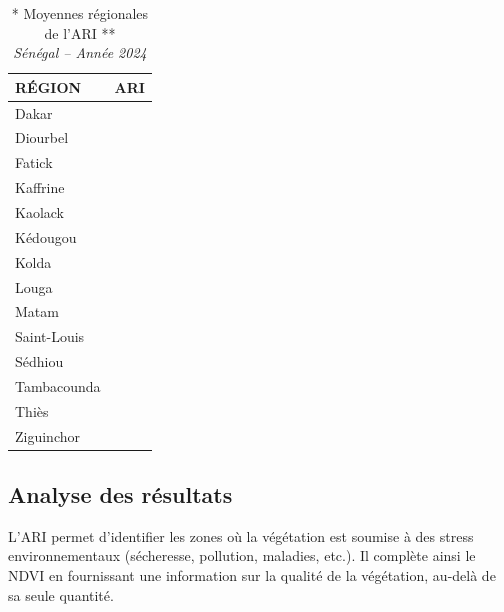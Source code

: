 \documentclass[
]{book}
\begin{document}
\begin{table}[!t]
\caption*{
{\large ** Moyennes régionales de l'ARI **} \\ 
{\small \emph{Sénégal -- Année 2024}}
} 
\fontsize{12.0pt}{14.4pt}\selectfont
\begin{tabular*}{\linewidth}{@{\extracolsep{\fill}}lr}
\toprule
{RÉGION} & {ARI} \\ 
\midrule\addlinespace[2.5pt]
Dakar & {\cellcolor[HTML]{C6171C}{\textcolor[HTML]{FFFFFF}{-0.130}}} \\ 
Diourbel & {\cellcolor[HTML]{FFECE3}{\textcolor[HTML]{000000}{-0.199}}} \\ 
Fatick & {\cellcolor[HTML]{F96244}{\textcolor[HTML]{FFFFFF}{-0.153}}} \\ 
Kaffrine & {\cellcolor[HTML]{FDC3AB}{\textcolor[HTML]{000000}{-0.183}}} \\ 
Kaolack & {\cellcolor[HTML]{FCB499}{\textcolor[HTML]{000000}{-0.178}}} \\ 
Kédougou & {\cellcolor[HTML]{67000D}{\textcolor[HTML]{FFFFFF}{-0.107}}} \\ 
Kolda & {\cellcolor[HTML]{F55239}{\textcolor[HTML]{FFFFFF}{-0.149}}} \\ 
Louga & {\cellcolor[HTML]{FFF5F0}{\textcolor[HTML]{000000}{-0.205}}} \\ 
Matam & {\cellcolor[HTML]{FCB59A}{\textcolor[HTML]{000000}{-0.179}}} \\ 
Saint-Louis & {\cellcolor[HTML]{FCBEA5}{\textcolor[HTML]{000000}{-0.181}}} \\ 
Sédhiou & {\cellcolor[HTML]{FA6748}{\textcolor[HTML]{FFFFFF}{-0.155}}} \\ 
Tambacounda & {\cellcolor[HTML]{E33127}{\textcolor[HTML]{FFFFFF}{-0.140}}} \\ 
Thiès & {\cellcolor[HTML]{FED2C0}{\textcolor[HTML]{000000}{-0.188}}} \\ 
Ziguinchor & {\cellcolor[HTML]{EF3C2C}{\textcolor[HTML]{FFFFFF}{-0.144}}} \\ 
\bottomrule
\end{tabular*}
\end{table}

\subsection{Analyse des résultats}\label{analyse-des-ruxe9sultats-1}

L'ARI permet d'identifier les zones où la végétation est soumise à des stress environnementaux (sécheresse, pollution, maladies, etc.). Il complète ainsi le NDVI en fournissant une information sur la qualité de la végétation, au-delà de sa seule quantité.
\end{document}
